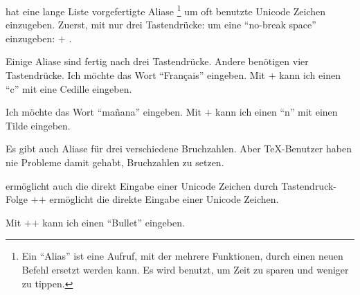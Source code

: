  hat eine lange Liste vorgefertigte Aliase%
\footnote{Ein \enquote{Alias} ist eine Aufruf, mit der
mehrere Funktionen, durch einen neuen Befehl ersetzt werden kann.
Es wird benutzt, um Zeit zu sparen und weniger zu tippen.}%
um oft benutzte Unicode Zeichen einzugeben. Zuerst, mit nur
drei Tastendrücke: um eine \enquote{no-break space} einzugeben: %
\hbox{\Ctrl$+$}%
%
\Spacebar .

Einige Aliase sind fertig nach drei Tastendrücke. Andere
benötigen vier Tastendrücke. Ich möchte das Wort \enquote{Français}
eingeben. Mit %
\hbox{\Ctrl$+$}%
\keystroke{,}%
%
\space%
kann ich einen \enquote{c} mit eine Cedille eingeben.

Ich möchte das Wort \enquote{mañana} eingeben. Mit %
\hbox{\Ctrl$+$}%
%
%
\space%
kann ich einen \enquote{n} mit einen Tilde eingeben.

Es gibt auch Aliase für drei verschiedene Bruchzahlen. Aber
\TeX{}-Benutzer haben nie Probleme damit gehabt, Bruchzahlen
zu setzen.

\label{unicodeviagedit}

 ermöglicht auch die direkt Eingabe einer Unicode
Zeichen durch Tastendruck-Folge %
\hbox{\Shift$+$\Ctrl$+$}%
%
\Return{}%
\space%
ermöglicht die direkte Eingabe einer Unicode
Zeichen.

Mit %
\hbox{\Shift$+$\Ctrl$+$}%
%
%
%
%
\Return{}%
\space%
kann ich einen \enquote{Bullet} eingeben.







